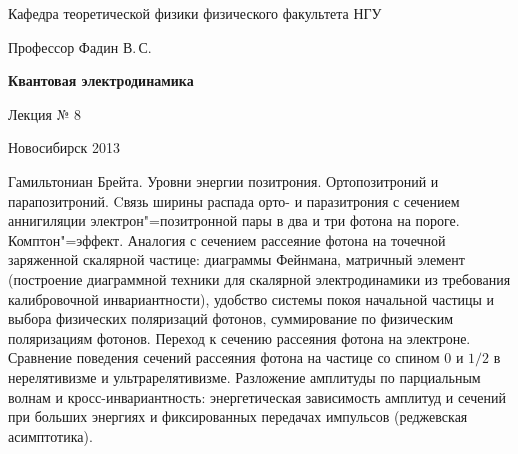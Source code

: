 \documentclass[12pt,pagesize,paper=192mm:108mm]{scrbook}
\begin{document}
\begin{titlepage}
\begin{center}
    Кафедра теоретической физики физического факультета НГУ
    \medskip

    \Large
    Профессор Фадин В.\,С.
    \bigskip

    \huge
    \textbf{Квантовая электродинамика}
    \bigskip

    \Large
    Лекция № 8
    \vfill

    \normalsize
    \vfill

    \normalsize \ccbysa\hspace{0.5em}  Новосибирск 2013
  \end{center}
\end{titlepage}
\vspace*{-1em}
\begin{center}
\vfill
  \begin{minipage}{0.75\linewidth}
    Гамильтониан Брейта. Уровни энергии позитрония. Ортопозитроний и
    парапозитроний. Cвязь ширины распада орто- и паразитрония с
    сечением аннигиляции электрон"=позитронной пары в два и три фотона
    на пороге. Комптон"=эффект. Аналогия с сечением рассеяние фотона на
    точечной заряженной скалярной частице: диаграммы Фейнмана,
    матричный элемент (построение диаграммной техники для скалярной
    электродинамики из требования калибровочной инвариантности),
    удобство системы покоя начальной частицы и выбора физических
    поляризаций фотонов, суммирование по физическим поляризациям
    фотонов.  Переход к сечению рассеяния фотона на
    электроне. Сравнение поведения сечений рассеяния фотона на частице
    со спином 0 и $1/2$ в нерелятивизме и ультрарелятивизме. Разложение
    амплитуды по парциальным волнам и кросс-инвариантность:
    энергетическая зависимость амплитуд и сечений при больших энергиях
    и фиксированных передачах импульсов (реджевская асимптотика).
  \end{minipage}
  \vfill

\end{center}
\end{document}
